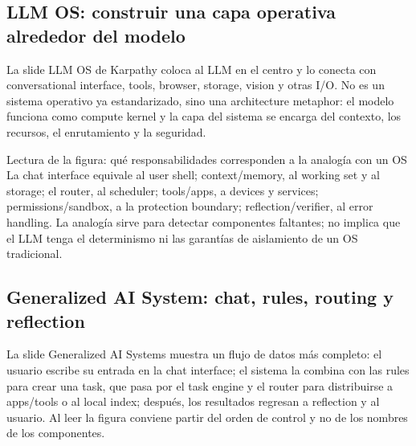 
\subsection{LLM OS: construir una capa operativa alrededor del modelo}

La slide LLM OS de Karpathy coloca al LLM en el centro y lo conecta con conversational interface, tools, browser, storage, vision y otras I/O. No es un sistema operativo ya estandarizado, sino una architecture metaphor: el modelo funciona como compute kernel y la capa del sistema se encarga del contexto, los recursos, el enrutamiento y la seguridad.


\begin{knowledgebox}{Lectura de la figura: qué responsabilidades corresponden a la analogía con un OS}
La chat interface equivale al user shell; context/memory, al working set y al storage; el router, al scheduler; tools/apps, a devices y services; permissions/sandbox, a la protection boundary; reflection/verifier, al error handling. La analogía sirve para detectar componentes faltantes; no implica que el LLM tenga el determinismo ni las garantías de aislamiento de un OS tradicional.
\end{knowledgebox}


\subsection{Generalized AI System: chat, rules, routing y reflection}

La slide Generalized AI Systems muestra un flujo de datos más completo: el usuario escribe su entrada en la chat interface; el sistema la combina con las rules para crear una task, que pasa por el task engine y el router para distribuirse a apps/tools o al local index; después, los resultados regresan a reflection y al usuario. Al leer la figura conviene partir del orden de control y no de los nombres de los componentes.


